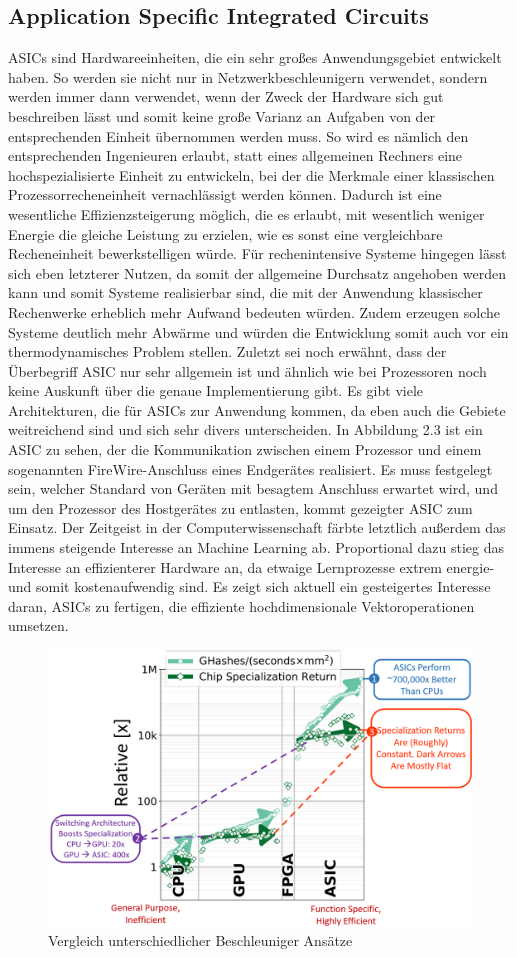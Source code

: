 \subsection{Application Specific Integrated Circuits}
ASICs sind Hardwareeinheiten, die ein sehr großes Anwendungsgebiet entwickelt haben. So werden sie nicht nur in Netzwerkbeschleunigern verwendet, sondern werden immer dann verwendet, wenn der Zweck der Hardware sich gut beschreiben lässt und somit keine große Varianz an Aufgaben von der entsprechenden Einheit übernommen werden muss. So wird es nämlich den entsprechenden Ingenieuren erlaubt, statt eines allgemeinen Rechners eine hochspezialisierte Einheit zu entwickeln, bei der die Merkmale einer klassischen Prozessorrecheneinheit vernachlässigt werden können. Dadurch ist eine wesentliche Effizienzsteigerung möglich, die es erlaubt, mit wesentlich weniger Energie die gleiche Leistung zu erzielen, wie es sonst eine vergleichbare Recheneinheit bewerkstelligen würde. Für rechenintensive Systeme hingegen lässt sich eben letzterer Nutzen, da somit der allgemeine Durchsatz angehoben werden kann und somit Systeme realisierbar sind, die mit der Anwendung klassischer Rechenwerke erheblich mehr Aufwand bedeuten würden. Zudem erzeugen solche Systeme deutlich mehr Abwärme und würden die Entwicklung somit auch vor ein thermodynamisches Problem stellen. Zuletzt sei noch erwähnt, dass der Überbegriff ASIC nur sehr allgemein ist und ähnlich wie bei Prozessoren noch keine Auskunft über die genaue Implementierung gibt. Es gibt viele Architekturen, die für ASICs zur Anwendung kommen, da eben auch die Gebiete weitreichend sind und sich sehr divers unterscheiden. In Abbildung 2.3 ist ein ASIC zu sehen, der die Kommunikation zwischen einem Prozessor und einem sogenannten FireWire-Anschluss eines Endgerätes realisiert. Es muss festgelegt sein, welcher Standard von Geräten mit besagtem Anschluss erwartet wird, und um den Prozessor des Hostgerätes zu entlasten, kommt gezeigter ASIC zum Einsatz.
Der Zeitgeist in der Computerwissenschaft färbte letztlich außerdem das immens steigende Interesse an Machine Learning ab. Proportional dazu stieg das Interesse an effizienterer Hardware an, da etwaige Lernprozesse extrem energie- und somit kostenaufwendig sind. Es zeigt sich aktuell ein gesteigertes Interesse daran, ASICs zu fertigen, die effiziente hochdimensionale Vektoroperationen umsetzen. 
\begin{figure}
    \centering
    \includegraphics[width=0.8\linewidth]{images/aisic.png}
    \caption{Vergleich unterschiedlicher Beschleuniger Ansätze}
    \label{fig:enter-label}
\end{figure}
